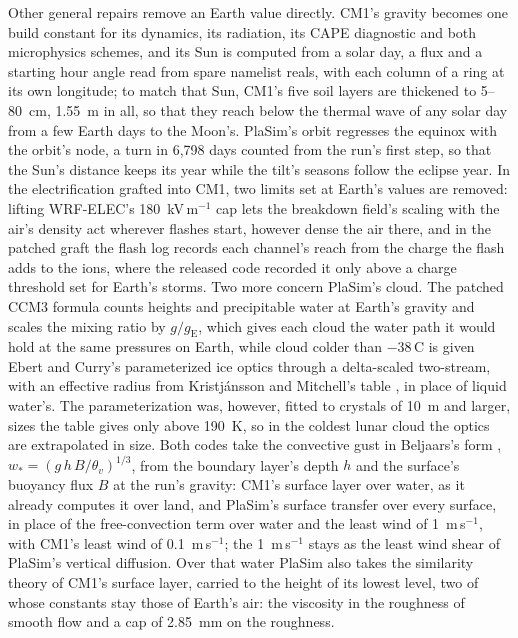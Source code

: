 Other general repairs remove an Earth value directly. CM1's gravity becomes one build constant for its
dynamics, its radiation, its CAPE diagnostic and both microphysics schemes, and its Sun is computed from a solar day, a flux and a starting hour angle read from spare namelist reals, with each column of a ring at its own longitude;
to match that Sun, CM1's five soil layers are thickened to 5--80~cm, 1.55~m in all, so that they reach below
the thermal wave of any solar day from a few Earth days to the Moon's. PlaSim's orbit regresses the equinox with the
orbit's node, a turn in 6,798 days counted from the run's first step, so that the Sun's distance keeps its year
while the tilt's seasons follow the eclipse year. In the electrification grafted into CM1,
two limits set at Earth's values are removed: lifting WRF-ELEC's 180~kV\,m$^{-1}$ cap lets the breakdown field's
scaling with the air's density act wherever flashes start, however dense the air there, and in the patched
graft the flash log records each channel's reach from the charge the flash adds to the ions, where the
released code recorded it only above a charge threshold set for Earth's storms. Two more concern PlaSim's cloud.
The patched CCM3 formula counts heights and precipitable water at Earth's gravity and scales the mixing ratio by
$g/g_\mathrm{E}$, which gives each cloud the water path it would hold at the same pressures on
Earth, while cloud colder than $-38$\,\textdegree C is given Ebert and Curry's parameterized ice
optics \autocite{ebert1992parameterization} through a delta-scaled two-stream, with an effective radius from
Kristjánsson and Mitchell's table \autocite{kristjansson2000impact}, in place of liquid water's. The
parameterization was, however, fitted to crystals of 10~\textmu m and larger, sizes the table gives only above
190~K, so in the coldest lunar cloud the optics are extrapolated in size. Both codes take the convective
gust in Beljaars's form \autocite{beljaars1995parametrization}, $w_* = (g\,h\,B/\theta_v)^{1/3}$, from the boundary
layer's depth $h$ and the surface's buoyancy flux $B$ at the run's gravity: CM1's surface layer over water, as it
already computes it over land, and PlaSim's surface transfer over every surface, in place of the free-convection
term over water and the least wind of 1~m\,s$^{-1}$, with CM1's least wind of 0.1~m\,s$^{-1}$; the 1~m\,s$^{-1}$
stays as the least wind shear of PlaSim's vertical diffusion.
Over that water PlaSim also takes the similarity theory of CM1's surface layer, carried to the height of its lowest
level, two of whose constants stay those of Earth's air: the viscosity in the roughness of smooth flow and a cap of
2.85~mm on the roughness.

